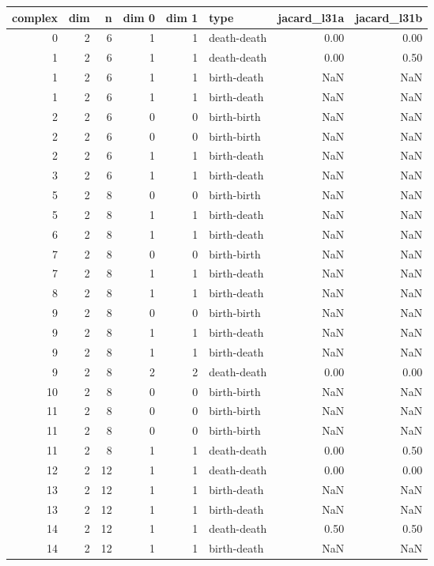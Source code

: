 \documentclass{article}
\begin{document}
\begin{center}
\begin{tabular}{rrrrrlrr}
\toprule
complex & dim & n & dim 0 & dim 1 & type & jacard\_l31a & jacard\_l31b \\
\midrule
0 & 2 & 6 & 1 & 1 & death-death & 0.00 & 0.00 \\
1 & 2 & 6 & 1 & 1 & death-death & 0.00 & 0.50 \\
1 & 2 & 6 & 1 & 1 & birth-death & NaN & NaN \\
1 & 2 & 6 & 1 & 1 & birth-death & NaN & NaN \\
2 & 2 & 6 & 0 & 0 & birth-birth & NaN & NaN \\
2 & 2 & 6 & 0 & 0 & birth-birth & NaN & NaN \\
2 & 2 & 6 & 1 & 1 & birth-death & NaN & NaN \\
3 & 2 & 6 & 1 & 1 & birth-death & NaN & NaN \\
5 & 2 & 8 & 0 & 0 & birth-birth & NaN & NaN \\
5 & 2 & 8 & 1 & 1 & birth-death & NaN & NaN \\
6 & 2 & 8 & 1 & 1 & birth-death & NaN & NaN \\
7 & 2 & 8 & 0 & 0 & birth-birth & NaN & NaN \\
7 & 2 & 8 & 1 & 1 & birth-death & NaN & NaN \\
8 & 2 & 8 & 1 & 1 & birth-death & NaN & NaN \\
9 & 2 & 8 & 0 & 0 & birth-birth & NaN & NaN \\
9 & 2 & 8 & 1 & 1 & birth-death & NaN & NaN \\
9 & 2 & 8 & 1 & 1 & birth-death & NaN & NaN \\
9 & 2 & 8 & 2 & 2 & death-death & 0.00 & 0.00 \\
10 & 2 & 8 & 0 & 0 & birth-birth & NaN & NaN \\
11 & 2 & 8 & 0 & 0 & birth-birth & NaN & NaN \\
11 & 2 & 8 & 0 & 0 & birth-birth & NaN & NaN \\
11 & 2 & 8 & 1 & 1 & death-death & 0.00 & 0.50 \\
12 & 2 & 12 & 1 & 1 & death-death & 0.00 & 0.00 \\
13 & 2 & 12 & 1 & 1 & birth-death & NaN & NaN \\
13 & 2 & 12 & 1 & 1 & birth-death & NaN & NaN \\
14 & 2 & 12 & 1 & 1 & death-death & 0.50 & 0.50 \\
14 & 2 & 12 & 1 & 1 & birth-death & NaN & NaN \\

\end{tabular}
\end{center}
\end{document}
